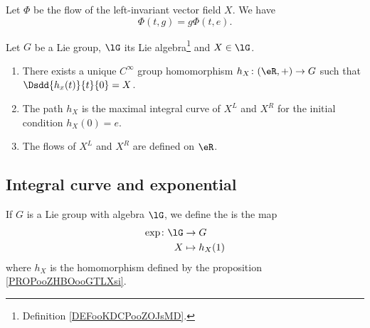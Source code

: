 \begin{proposition} \label{PROPooUXFQooIwimav}
    Let \( \Phi\) be the flow of the left-invariant vector field \( X\). We have
    \begin{equation}
        \Phi(t,g)=g\Phi(t,e).
    \end{equation}
\end{proposition}

\begin{proposition}     \label{PROPooZHBOooGTLXsi}
    Let \( G\) be a Lie group, \( \lG\) its Lie algebra\footnote{Definition \ref{DEFooKDCPooZOJsMD}.} and \( X\in\lG\). 
    \begin{enumerate}
        \item
            There exists a unique \(  C^{\infty}\) group homomorphism \( h_X\colon (\eR,+)\to G\) such that \( \Dsdd{ h_x(t) }{t}{0}=X\).
        \item
            The path \( h_X\) is the maximal integral curve of \( X^L\) and \( X^R\) for the initial condition \( h_X(0)=e\).
        \item
            The flows of \( X^L\) and \( X^R\) are defined on \( \eR\).
    \end{enumerate}
\end{proposition}

\subsection{Integral curve and exponential}

\begin{definition}
    If \( G\) is a Lie group with algebra \( \lG\), we define the  is the map
    \begin{equation}\label{EqdefExpoLieTgFGp}
        \begin{aligned}
            \exp\colon \lG&\to G \\
            X&\mapsto h_X(1) 
        \end{aligned}
    \end{equation}
    where \( h_X\) is the homomorphism defined by the proposition \ref{PROPooZHBOooGTLXsi}. 
\end{definition}

